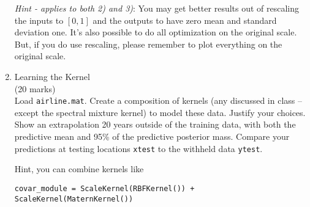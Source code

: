 \documentclass[11pt]{article}
\begin{document}
\begin{enumerate}
\textit{Hint - applies to both 2) and 3)}: You may get better results out of rescaling the inputs to $[0,1]$ and the outputs to have zero mean and standard deviation one. It's also possible to do all optimization on the original scale. But, if you do use rescaling, please remember to plot everything on the original scale.

\item Learning the Kernel \\
(20 marks) \\

Load \texttt{airline.mat}.  Create a composition of kernels (any discussed in class -- except the spectral mixture kernel) to model these data.  Justify your choices.  Show an extrapolation 20 years outside of the training data, with both the predictive mean and 95\% of the predictive posterior mass.  Compare your predictions at testing locations \texttt{xtest} to the withheld data \texttt{ytest}.

Hint, you can combine kernels like
\begin{lstlisting}
covar_module = ScaleKernel(RBFKernel()) + ScaleKernel(MaternKernel())
\end{lstlisting}
\end{enumerate}
\end{document}
